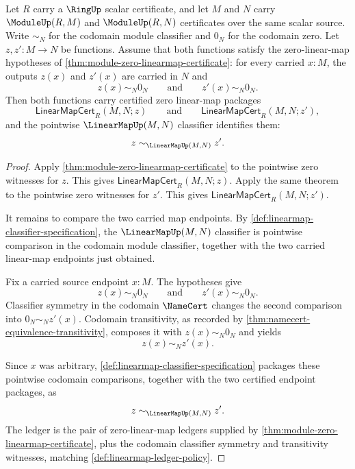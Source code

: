\begin{theorem}
\label{thm:module-zero-linearmap-classifier-uniqueness}
Let $R$ carry a $\RingUp$ scalar certificate, and let $M$ and $N$ carry $\ModuleUp(R,M)$ and $\ModuleUp(R,N)$ certificates over the same scalar source. Write $\sim_N$ for the codomain module classifier and $0_N$ for the codomain zero. Let $z,z':M\to N$ be functions. Assume that both functions satisfy the zero-linear-map hypotheses of \autoref{thm:module-zero-linearmap-certificate}: for every carried $x:M$, the outputs $z(x)$ and $z'(x)$ are carried in $N$ and
$$
z(x)\sim_N0_N
\qquad\text{and}\qquad
z'(x)\sim_N0_N.
$$
Then both functions carry certified zero linear-map packages
$$
\mathsf{LinearMapCert}_R(M,N;z)
\qquad\text{and}\qquad
\mathsf{LinearMapCert}_R(M,N;z'),
$$
and the pointwise $\LinearMapUp(M,N)$ classifier identifies them:
$$
z\sim_{\LinearMapUp(M,N)}z'.
$$
\end{theorem}
\begin{proof}
Apply \autoref{thm:module-zero-linearmap-certificate} to the pointwise zero witnesses for $z$. This gives $\mathsf{LinearMapCert}_R(M,N;z)$. Apply the same theorem to the pointwise zero witnesses for $z'$. This gives $\mathsf{LinearMapCert}_R(M,N;z')$.

It remains to compare the two carried map endpoints. By \autoref{def:linearmap-classifier-specification}, the $\LinearMapUp(M,N)$ classifier is pointwise comparison in the codomain module classifier, together with the two carried linear-map endpoints just obtained.

Fix a carried source endpoint $x:M$. The hypotheses give
$$
z(x)\sim_N0_N
\qquad\text{and}\qquad
z'(x)\sim_N0_N.
$$
Classifier symmetry in the codomain $\NameCert$ changes the second comparison into $0_N\sim_Nz'(x)$. Codomain transitivity, as recorded by \autoref{thm:namecert-equivalence-transitivity}, composes it with $z(x)\sim_N0_N$ and yields
$$
z(x)\sim_Nz'(x).
$$

Since $x$ was arbitrary, \autoref{def:linearmap-classifier-specification} packages these pointwise codomain comparisons, together with the two certified endpoint packages, as
$$
z\sim_{\LinearMapUp(M,N)}z'.
$$
The ledger is the pair of zero-linear-map ledgers supplied by \autoref{thm:module-zero-linearmap-certificate}, plus the codomain classifier symmetry and transitivity witnesses, matching \autoref{def:linearmap-ledger-policy}.
\end{proof}
